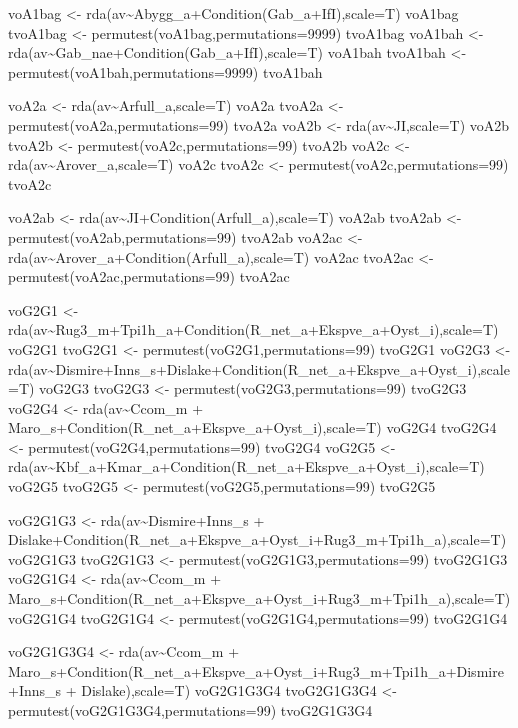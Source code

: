 \documentclass[]{article}
\begin{document}
voA1bag \textless{}-
rda(av\textasciitilde{}Abygg\_a+Condition(Gab\_a+IfI),scale=T) voA1bag
tvoA1bag \textless{}- permutest(voA1bag,permutations=9999) tvoA1bag
voA1bah \textless{}-
rda(av\textasciitilde{}Gab\_nae+Condition(Gab\_a+IfI),scale=T) voA1bah
tvoA1bah \textless{}- permutest(voA1bah,permutations=9999) tvoA1bah

voA2a \textless{}- rda(av\textasciitilde{}Arfull\_a,scale=T) voA2a
tvoA2a \textless{}- permutest(voA2a,permutations=99) tvoA2a voA2b
\textless{}- rda(av\textasciitilde{}JI,scale=T) voA2b tvoA2b
\textless{}- permutest(voA2c,permutations=99) tvoA2b voA2c \textless{}-
rda(av\textasciitilde{}Arover\_a,scale=T) voA2c tvoA2c \textless{}-
permutest(voA2c,permutations=99) tvoA2c

voA2ab \textless{}-
rda(av\textasciitilde{}JI+Condition(Arfull\_a),scale=T) voA2ab tvoA2ab
\textless{}- permutest(voA2ab,permutations=99) tvoA2ab voA2ac
\textless{}-
rda(av\textasciitilde{}Arover\_a+Condition(Arfull\_a),scale=T) voA2ac
tvoA2ac \textless{}- permutest(voA2ac,permutations=99) tvoA2ac

voG2G1 \textless{}-
rda(av\textasciitilde{}Rug3\_m+Tpi1h\_a+Condition(R\_net\_a+Ekspve\_a+Oyst\_i),scale=T)
voG2G1 tvoG2G1 \textless{}- permutest(voG2G1,permutations=99) tvoG2G1
voG2G3 \textless{}-
rda(av\textasciitilde{}Dismire+Inns\_s+Dislake+Condition(R\_net\_a+Ekspve\_a+Oyst\_i),scale=T)
voG2G3 tvoG2G3 \textless{}- permutest(voG2G3,permutations=99) tvoG2G3
voG2G4 \textless{}- rda(av\textasciitilde{}Ccom\_m +
Maro\_s+Condition(R\_net\_a+Ekspve\_a+Oyst\_i),scale=T) voG2G4 tvoG2G4
\textless{}- permutest(voG2G4,permutations=99) tvoG2G4 voG2G5
\textless{}-
rda(av\textasciitilde{}Kbf\_a+Kmar\_a+Condition(R\_net\_a+Ekspve\_a+Oyst\_i),scale=T)
voG2G5 tvoG2G5 \textless{}- permutest(voG2G5,permutations=99) tvoG2G5

voG2G1G3 \textless{}- rda(av\textasciitilde{}Dismire+Inns\_s +
Dislake+Condition(R\_net\_a+Ekspve\_a+Oyst\_i+Rug3\_m+Tpi1h\_a),scale=T)
voG2G1G3 tvoG2G1G3 \textless{}- permutest(voG2G1G3,permutations=99)
tvoG2G1G3 voG2G1G4 \textless{}- rda(av\textasciitilde{}Ccom\_m +
Maro\_s+Condition(R\_net\_a+Ekspve\_a+Oyst\_i+Rug3\_m+Tpi1h\_a),scale=T)
voG2G1G4 tvoG2G1G4 \textless{}- permutest(voG2G1G4,permutations=99)
tvoG2G1G4

voG2G1G3G4 \textless{}- rda(av\textasciitilde{}Ccom\_m +
Maro\_s+Condition(R\_net\_a+Ekspve\_a+Oyst\_i+Rug3\_m+Tpi1h\_a+Dismire+Inns\_s
+ Dislake),scale=T) voG2G1G3G4 tvoG2G1G3G4 \textless{}-
permutest(voG2G1G3G4,permutations=99) tvoG2G1G3G4
\end{document}
